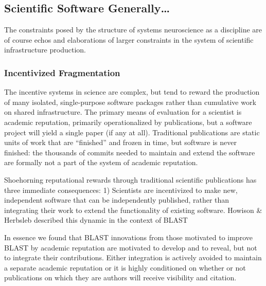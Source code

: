 \documentclass[10pt]{article}
\begin{document}
\begin{multicols}{2}
\end{multicols}


\hypertarget{scientific-software-generally}{%
\subsection{Scientific Software
Generally\ldots{}}\label{scientific-software-generally}}


\begin{multicols}{2}
 The constraints posed by the structure of systems
neuroscience as a discipline are of course echos and elaborations of
larger constraints in the system of scientific infrastructure
production.

\hypertarget{incentivized-fragmentation}{%
\subsubsection{Incentivized
Fragmentation}\label{incentivized-fragmentation}}

The incentive systems in science are complex, but tend to reward the
production of many isolated, single-purpose software packages rather
than cumulative work on shared infrastructure. The primary means of
evaluation for a scientist is academic reputation, primarily
operationalized by publications, but a software project will yield a
single paper (if any at all). Traditional publications are static units
of work that are ``finished'' and frozen in time, but software is never
finished: the thousands of commits needed to maintain and extend the
software are formally not a part of the system of academic reputation.

Shoehorning reputational rewards through traditional scientific
publications has three immediate consequences: 1) Scientists are
incentivized to make new, independent software that can be independently
published, rather than integrating their work to extend the
functionality of existing software. Howison \& Herbsleb described this
dynamic in the context of BLAST

\begin{leftbar}
In essence we found that BLAST innovations from those motivated to
improve BLAST by academic reputation are motivated to develop and to
reveal, but not to integrate their contributions. Either integration is
actively avoided to maintain a separate academic reputation or it is
highly conditioned on whether or not publications on which they are
authors will receive visibility and citation. \cite{howisonIncentivesIntegrationScientific2013} 
\end{leftbar}


\end{multicols}
\end{document}
